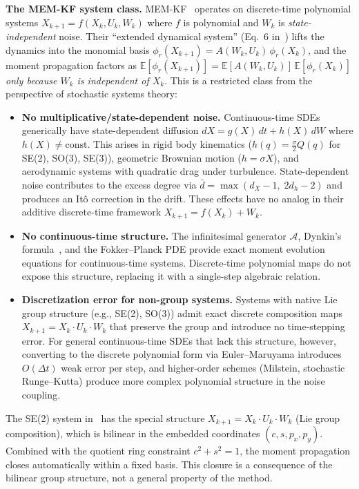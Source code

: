 \documentclass{article}
\newcommand{\E}{\mathbb{E}}
\theoremstyle{definition}
\begin{document}
\textbf{The MEM-KF system class.}
MEM-KF~\cite{teng2025} operates on discrete-time polynomial systems
$X_{k+1} = f(X_k, U_k, W_k)$
where $f$ is polynomial and $W_k$ is \emph{state-independent} noise.
Their ``extended dynamical system'' (Eq.~6 in~\cite{teng2025})
lifts the dynamics into the monomial basis
$\phi_r(X_{k+1}) = A(W_k, U_k)\,\phi_r(X_k)$,
and the moment propagation factors as
$\E[\phi_r(X_{k+1})] = \E[A(W_k, U_k)]\,\E[\phi_r(X_k)]$
\emph{only because $W_k$ is independent of $X_k$}.
This is a restricted class from the perspective of stochastic systems theory:
\begin{itemize}
    \item \textbf{No multiplicative/state-dependent noise.}
    Continuous-time SDEs generically have state-dependent diffusion
    $dX = g(X)\,dt + h(X)\,dW$ where $h(X) \ne \text{const}$.
    This arises in rigid body kinematics
    ($h(q) = \frac{\sigma}{2}Q(q)$ for SE(2), SO(3), SE(3)),
    geometric Brownian motion ($h = \sigma X$),
    and aerodynamic systems with quadratic drag under turbulence.
    State-dependent noise contributes to the excess degree
    via $\bar{d} = \max(d_X{-}1,\; 2d_h{-}2)$
    and produces an It\^o correction in the drift.
    These effects have no analog in their additive
    discrete-time framework $X_{k+1} = f(X_k) + W_k$.
    \item \textbf{No continuous-time structure.}
    The infinitesimal generator $\mathcal{A}$,
    Dynkin's formula~\cite{oksendal2003},
    and the Fokker--Planck PDE
    provide exact moment evolution equations for continuous-time systems.
    Discrete-time polynomial maps do not expose this structure,
    replacing it with a single-step algebraic relation.
    \item \textbf{Discretization error for non-group systems.}
    Systems with native Lie group structure (e.g., SE(2), SO(3))
    admit exact discrete composition maps
    $X_{k+1} = X_k \cdot U_k \cdot W_k$ that preserve the group
    and introduce no time-stepping error.
    For general continuous-time SDEs that lack this structure,
    however, converting to the discrete polynomial form
    via Euler--Maruyama introduces $O(\Delta t)$ weak error
    per step, and higher-order schemes (Milstein, stochastic
    Runge--Kutta) produce more complex polynomial structure
    in the noise coupling.
\end{itemize}

The SE(2) system in~\cite{teng2025} has the special structure
$X_{k+1} = X_k \cdot U_k \cdot W_k$ (Lie group composition),
which is bilinear in the embedded coordinates $(c, s, p_x, p_y)$.
Combined with the quotient ring constraint $c^2 + s^2 = 1$,
the moment propagation closes automatically within a fixed basis.
This closure is a consequence of the bilinear group structure,
not a general property of the method.
\end{document}
